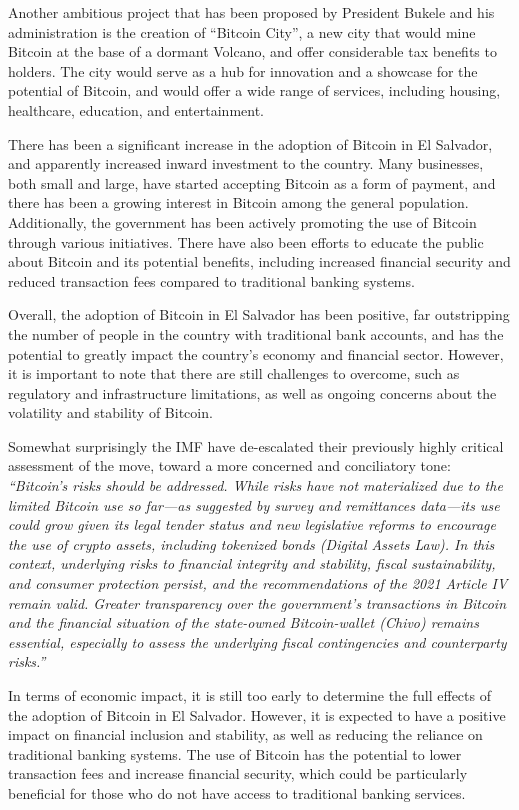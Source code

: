 Another ambitious project that has been proposed by President Bukele and his administration is the creation of ``Bitcoin City'', a new city that would mine Bitcoin at the base of a dormant Volcano, and offer considerable tax benefits to holders. The city would serve as a hub for innovation and a showcase for the potential of Bitcoin, and would offer a wide range of services, including housing, healthcare, education, and entertainment.\par
There has been a significant increase in the adoption of Bitcoin in El Salvador, and apparently increased inward investment to the country. Many businesses, both small and large, have started accepting Bitcoin as a form of payment, and there has been a growing interest in Bitcoin among the general population. Additionally, the government has been actively promoting the use of Bitcoin through various initiatives. There have also been efforts to educate the public about Bitcoin and its potential benefits, including increased financial security and reduced transaction fees compared to traditional banking systems.\par
Overall, the adoption of Bitcoin in El Salvador has been positive, far outstripping the number of people in the country with traditional bank accounts, and has the potential to greatly impact the country's economy and financial sector. However, it is important to note that there are still challenges to overcome, such as regulatory and infrastructure limitations, as well as ongoing concerns about the volatility and stability of Bitcoin.\par 
Somewhat surprisingly the IMF have de-escalated their previously highly critical assessment of the move, toward a more concerned and conciliatory tone:
\textit{``Bitcoin’s risks should be addressed. While risks have not materialized due to the limited Bitcoin use so far—as suggested by survey and remittances data—its use could grow given its legal tender status and new legislative reforms to encourage the use of crypto assets, including tokenized bonds (Digital Assets Law). In this context, underlying risks to financial integrity and stability, fiscal sustainability, and consumer protection persist, and the recommendations of the 2021 Article IV remain valid. Greater transparency over the government's transactions in Bitcoin and the financial situation of the state-owned Bitcoin-wallet (Chivo) remains essential, especially to assess the underlying fiscal contingencies and counterparty risks.''}\par
In terms of economic impact, it is still too early to determine the full effects of the adoption of Bitcoin in El Salvador. However, it is expected to have a positive impact on financial inclusion and stability, as well as reducing the reliance on traditional banking systems. The use of Bitcoin has the potential to lower transaction fees and increase financial security, which could be particularly beneficial for those who do not have access to traditional banking services.\par
